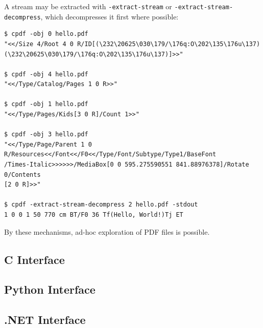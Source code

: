 \documentclass{book}
\begin{document}
\noindent A stream may be extracted with \texttt{-extract-stream} or \texttt{-extract-stream-decompress}, which decompresses it first where possible:

{\small\begin{verbatim}
$ cpdf -obj 0 hello.pdf
"<</Size 4/Root 4 0 R/ID[(\232\20625\030\179/\176q:O\202\135\176u\137)
(\232\20625\030\179/\176q:O\202\135\176u\137)]>>"

$ cpdf -obj 4 hello.pdf
"<</Type/Catalog/Pages 1 0 R>>"

$ cpdf -obj 1 hello.pdf
"<</Type/Pages/Kids[3 0 R]/Count 1>>"

$ cpdf -obj 3 hello.pdf
"<</Type/Page/Parent 1 0 R/Resources<</Font<</F0<</Type/Font/Subtype/Type1/BaseFont
/Times-Italic>>>>>>/MediaBox[0 0 595.275590551 841.88976378]/Rotate 0/Contents
[2 0 R]>>"

$ cpdf -extract-stream-decompress 2 hello.pdf -stdout
1 0 0 1 50 770 cm BT/F0 36 Tf(Hello, World!)Tj ET
\end{verbatim}}

\noindent By these mechanisms, ad-hoc exploration of PDF files is possible.

\begin{cpdflib}
\clearpage
\section*{C Interface}
\begin{small}\tt

\end{small}
\end{cpdflib}

\begin{pycpdflib}
\clearpage
\section*{Python Interface}
\begin{small}\tt

\end{small}
\end{pycpdflib}

\begin{dotnetcpdflib}
\clearpage
\section*{.NET Interface}
\begin{small}\tt

\end{small}
\end{dotnetcpdflib}
\end{document}
